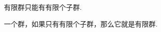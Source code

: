 \begin{example}
有限群只能有有限个子群.
\end{example}

\begin{example}
一个群，如果只有有限个子群，那么它就是有限群.
\end{example}

%
%
%
